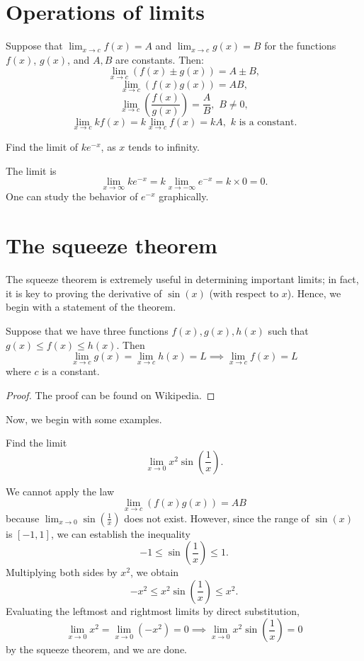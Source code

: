 \newpage

\section{Operations of limits}
Suppose that $\lim_{x \to c} f(x) = A$ and $\lim_{x \to c} g(x) = B$ for the functions $f(x)$, $g(x)$,
and $A,B$ are constants. Then:
\[
\lim_{x \to c} (f(x) \pm g(x)) = A \pm B,
\]
\[
\lim_{x \to c} (f(x) g(x)) = A B,
\]
\[
\lim_{x \to c} \left(\frac{f(x)}{g(x)}\right)  = \frac{A}{B},\,\,B\ne 0,
\]
\[
\lim_{x \to c} kf(x) = k\lim_{x \to c} f(x) = kA,\,\,k\,\,\text{is a constant.}
\]

\begin{example}
    Find the limit of $k e^{-x}$, as $x$ tends to infinity. 
\end{example}
\begin{solution}
    The limit is \[\lim_{x \to \infty} k e^{-x} = k \lim_{x \to -\infty} e^{-x} = k \times 0 = 0.\]
    One can study the behavior of $e^{-x}$ graphically.
\end{solution}

\section{The squeeze theorem}
The squeeze theorem is extremely useful in determining important limits; in fact, it is key to proving the
derivative of $\sin(x)$ (with respect to $x$). Hence, we begin with a statement of the theorem.

\begin{theorem}
    Suppose that we have three functions $f(x), g(x), h(x)$ such that $g(x)\le f(x)\le h(x)$. Then
    \[
    \lim_{x \to c} g(x) = \lim_{x \to c} h(x) = L \implies \lim_{x \to c} f(x) = L
    \]
    where $c$ is a constant.
\end{theorem}
\begin{proof}
    The proof can be found on Wikipedia.
\end{proof}

Now, we begin with some examples.

\begin{example}
    Find the limit \[\lim_{x \to 0}x^2\sin\left(\frac{1}{x}\right).\]
\end{example}
\begin{solution}
    We cannot apply the law
    \[
    \lim_{x \to c} (f(x) g(x)) = A B
    \]
    because $\lim_{x \to 0} \sin\left(\frac{1}{x}\right)$ does not exist. However, since the range of $\sin(x)$
    is $[-1, 1]$, we can establish the inequality \[-1 \le \sin\left(\frac{1}{x}\right) \le 1.\] Multiplying both
    sides by $x^2$, we obtain \[-x^2 \le x^2 \sin\left(\frac{1}{x}\right) \le x^2.\]
    Evaluating the leftmost and
    rightmost limits by direct substitution,
    \[\lim_{x \to 0} x^2 = \lim_{x \to 0} (-x^2) = 0 \implies
    \lim_{x \to 0} x^2 \sin\left(\frac{1}{x}\right) = 0 \]
    by the squeeze theorem, and we are done.
\end{solution}

